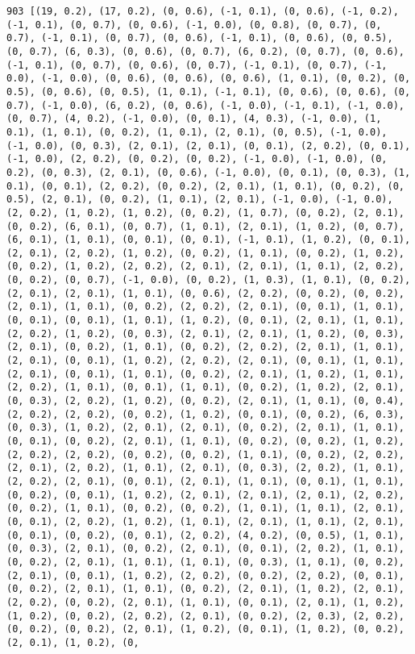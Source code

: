 \documentclass[11pt]{article}
\begin{document}
\begin{Verbatim}[commandchars=\\\{\}]
903 [(19, 0.2), (17, 0.2), (0, 0.6), (-1, 0.1), (0, 0.6), (-1, 0.2), (-1, 0.1), (0, 0.7), (0, 0.6), (-1, 0.0), (0, 0.8), (0, 0.7), (0, 0.7), (-1, 0.1), (0, 0.7), (0, 0.6), (-1, 0.1), (0, 0.6), (0, 0.5), (0, 0.7), (6, 0.3), (0, 0.6), (0, 0.7), (6, 0.2), (0, 0.7), (0, 0.6), (-1, 0.1), (0, 0.7), (0, 0.6), (0, 0.7), (-1, 0.1), (0, 0.7), (-1, 0.0), (-1, 0.0), (0, 0.6), (0, 0.6), (0, 0.6), (1, 0.1), (0, 0.2), (0, 0.5), (0, 0.6), (0, 0.5), (1, 0.1), (-1, 0.1), (0, 0.6), (0, 0.6), (0, 0.7), (-1, 0.0), (6, 0.2), (0, 0.6), (-1, 0.0), (-1, 0.1), (-1, 0.0), (0, 0.7), (4, 0.2), (-1, 0.0), (0, 0.1), (4, 0.3), (-1, 0.0), (1, 0.1), (1, 0.1), (0, 0.2), (1, 0.1), (2, 0.1), (0, 0.5), (-1, 0.0), (-1, 0.0), (0, 0.3), (2, 0.1), (2, 0.1), (0, 0.1), (2, 0.2), (0, 0.1), (-1, 0.0), (2, 0.2), (0, 0.2), (0, 0.2), (-1, 0.0), (-1, 0.0), (0, 0.2), (0, 0.3), (2, 0.1), (0, 0.6), (-1, 0.0), (0, 0.1), (0, 0.3), (1, 0.1), (0, 0.1), (2, 0.2), (0, 0.2), (2, 0.1), (1, 0.1), (0, 0.2), (0, 0.5), (2, 0.1), (0, 0.2), (1, 0.1), (2, 0.1), (-1, 0.0), (-1, 0.0), (2, 0.2), (1, 0.2), (1, 0.2), (0, 0.2), (1, 0.7), (0, 0.2), (2, 0.1), (0, 0.2), (6, 0.1), (0, 0.7), (1, 0.1), (2, 0.1), (1, 0.2), (0, 0.7), (6, 0.1), (1, 0.1), (0, 0.1), (0, 0.1), (-1, 0.1), (1, 0.2), (0, 0.1), (2, 0.1), (2, 0.2), (1, 0.2), (0, 0.2), (1, 0.1), (0, 0.2), (1, 0.2), (0, 0.2), (1, 0.2), (2, 0.2), (2, 0.1), (2, 0.1), (1, 0.1), (2, 0.2), (0, 0.2), (0, 0.7), (-1, 0.0), (0, 0.2), (1, 0.3), (1, 0.1), (0, 0.2), (2, 0.1), (2, 0.1), (1, 0.1), (0, 0.6), (2, 0.2), (0, 0.2), (0, 0.2), (2, 0.1), (1, 0.1), (0, 0.2), (2, 0.2), (2, 0.1), (0, 0.1), (1, 0.1), (0, 0.1), (0, 0.1), (1, 0.1), (1, 0.2), (0, 0.1), (2, 0.1), (1, 0.1), (2, 0.2), (1, 0.2), (0, 0.3), (2, 0.1), (2, 0.1), (1, 0.2), (0, 0.3), (2, 0.1), (0, 0.2), (1, 0.1), (0, 0.2), (2, 0.2), (2, 0.1), (1, 0.1), (2, 0.1), (0, 0.1), (1, 0.2), (2, 0.2), (2, 0.1), (0, 0.1), (1, 0.1), (2, 0.1), (0, 0.1), (1, 0.1), (0, 0.2), (2, 0.1), (1, 0.2), (1, 0.1), (2, 0.2), (1, 0.1), (0, 0.1), (1, 0.1), (0, 0.2), (1, 0.2), (2, 0.1), (0, 0.3), (2, 0.2), (1, 0.2), (0, 0.2), (2, 0.1), (1, 0.1), (0, 0.4), (2, 0.2), (2, 0.2), (0, 0.2), (1, 0.2), (0, 0.1), (0, 0.2), (6, 0.3), (0, 0.3), (1, 0.2), (2, 0.1), (2, 0.1), (0, 0.2), (2, 0.1), (1, 0.1), (0, 0.1), (0, 0.2), (2, 0.1), (1, 0.1), (0, 0.2), (0, 0.2), (1, 0.2), (2, 0.2), (2, 0.2), (0, 0.2), (0, 0.2), (1, 0.1), (0, 0.2), (2, 0.2), (2, 0.1), (2, 0.2), (1, 0.1), (2, 0.1), (0, 0.3), (2, 0.2), (1, 0.1), (2, 0.2), (2, 0.1), (0, 0.1), (2, 0.1), (1, 0.1), (0, 0.1), (1, 0.1), (0, 0.2), (0, 0.1), (1, 0.2), (2, 0.1), (2, 0.1), (2, 0.1), (2, 0.2), (0, 0.2), (1, 0.1), (0, 0.2), (0, 0.2), (1, 0.1), (1, 0.1), (2, 0.1), (0, 0.1), (2, 0.2), (1, 0.2), (1, 0.1), (2, 0.1), (1, 0.1), (2, 0.1), (0, 0.1), (0, 0.2), (0, 0.1), (2, 0.2), (4, 0.2), (0, 0.5), (1, 0.1), (0, 0.3), (2, 0.1), (0, 0.2), (2, 0.1), (0, 0.1), (2, 0.2), (1, 0.1), (0, 0.2), (2, 0.1), (1, 0.1), (1, 0.1), (0, 0.3), (1, 0.1), (0, 0.2), (2, 0.1), (0, 0.1), (1, 0.2), (2, 0.2), (0, 0.2), (2, 0.2), (0, 0.1), (0, 0.2), (2, 0.1), (1, 0.1), (0, 0.2), (2, 0.1), (1, 0.2), (2, 0.1), (2, 0.2), (0, 0.2), (2, 0.1), (1, 0.1), (0, 0.1), (2, 0.1), (1, 0.2), (1, 0.2), (0, 0.2), (2, 0.2), (2, 0.1), (0, 0.2), (2, 0.3), (2, 0.2), (0, 0.2), (0, 0.2), (2, 0.1), (1, 0.2), (0, 0.1), (1, 0.2), (0, 0.2), (2, 0.1), (1, 0.2), (0, 
\end{Verbatim}
\end{document}
